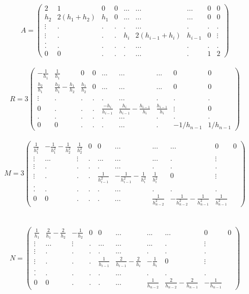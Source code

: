 \documentclass[a4paper,12pt]{article} %
\begin{document}
                 $$A=\begin{pmatrix} 2&1&0&0&...&...&...&0&0 \\ h_2&2(h_1+h_2)&h_1&0&...&...&...&0&0 \\ \vdots&.&.&.&.&...&.&.&.\\ \vdots&.&.&.&h_i&2(h_{i-1}+h_i)&h_{i-1}&0&\vdots \\. \\.&.&.&.&.&...&.&.&. \\ 0&0&.&.&.&...&.&1&2 \end{pmatrix}$$\\
                
                $$R=3\begin{pmatrix} -\frac{1}{h_1}&\frac{1}{h_1}&0&0&...&...&...&0&0 \\ \frac{h_2}{h_1}&\frac{h_2}{h_1}-\frac{h_1}{h_2}&\frac{h_1}{h_2}&0&...&...&...&0&0 \\ \vdots&.&.&.&.&...&.&.&.\\ 0&.&.&.&\frac{-h_i}{h_{i-1}}&\frac{h_i}{h_{i-1}}-\frac{h_{i-1}}{h_i}&\frac{h_{i-1}}{h_i}&\vdots&0 \\.&.&.&.&.&...&.&.&. \\ 0&0&.&.&.&...&.&-1/h_{n-1}&1/h_{n-1} \end{pmatrix}$$\\
                
                
                
                $$M=3\begin{pmatrix} \frac{1}{h_1^2}&-\frac{1}{h_1^2}-\frac{1}{h_2^2}&\frac{1}{h_2^2}&0&0&...&...&...&0&0 \\ \vdots&...&\vdots&.&...&...&...&.&\vdots \\ \vdots&.&.&.&.&...&.&.&.\\ \vdots&.&.&.&\frac{1}{h_{i-1}^2}&-\frac{1}{h_{i-1}^2}-\frac{1}{h_i^2}&\frac{1}{h_i^2}&0&\vdots \\. \\.&.&.&.&.&...&.&.&. \\ 0&0&.&.&.&...&\frac{1}{h_{n-2}^2}&-\frac{1}{h_{n-2}^2}-\frac{1}{h_{n-1}^2}&\frac{1}{h_{n-1}^2} \end{pmatrix}$$
                \\
                \\$$N=\begin{pmatrix} \frac{1}{h_1}&\frac{2}{h_1}-\frac{2}{h_2}&-\frac{1}{h_2}&0&0&...&...&...&0&0 \\ \vdots&...&\vdots&.&...&...&...&.&\vdots \\ \vdots&.&.&.&.&...&.&.&.\\ \vdots&.&.&.&\frac{1}{h_{i-1}}&\frac{2}{h_{i-1}}-\frac{2}{h_i}&-\frac{1}{h_i}&0&\vdots \\. \\.&.&.&.&.&...&.&.&. \\ 0&0&.&.&.&...&\frac{1}{h_{n-2}}&\frac{2}{h_{n-2}}-\frac{2}{h_{n-1}}&-\frac{1}{h_{n-1}} \end{pmatrix}$$\\
                
\end{document}
